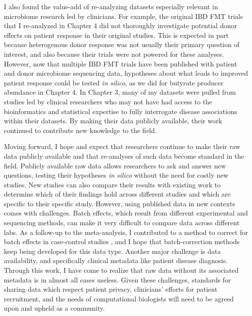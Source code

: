 I also found the value-add of re-analyzing datasets especially relevant in microbiome research led by clinicians.
For example, the original IBD FMT trials that I re-analyzed in Chapter 4 did not thoroughly investigate potential donor effects on patient response in their original studies.
This is expected in part because heterogenous donor response was not usually their primary question of interest, and also because their trials were not powered for these analyses.
However, now that multiple IBD FMT trials have been published with patient and donor microbiome sequencing data, hypotheses about what leads to improved patient response could be tested \textit{in silico}, as we did for butyrate producer abundance in Chapter 4.
In Chapter 3, many of my datasets were pulled from studies led by clinical researchers who may not have had access to the bioinformatics and statistical expertise to fully interrogate disease associations within their datasets.
By making their data publicly available, their work continued to contribute new knowledge to the field.

Moving forward, I hope and expect that researchers continue to make their raw data publicly available and that re-analyses of such data become standard in the field.
Publicly available raw data allows researchers to ask and answer new questions, testing their hypotheses \textit{in silico} without the need for costly new studies.
New studies can also compare their results with existing work to determine which of their findings hold across different studies and which are specific to their specific study.
However, using published data in new contexts comes with challenges.
Batch effects, which result from different experimental and sequencing methods, can make it very difficult to compare data across different labs.
As a follow-up to the meta-analysis, I contributed to a method to correct for batch effects in case-control studies \cite{gibbons-2018}, and I hope that batch-correction methods keep being developed for this data type.
Another major challenge is data availability, and specifically clinical metadata like patient disease diagnosis.
Through this work, I have come to realize that raw data without its associated metadata is in almost all cases useless.
Given these challenges, standards for sharing data which respect patient privacy, clinicians' efforts for patient recruitment, and the needs of computational biologists will need to be agreed upon and upheld as a community.

